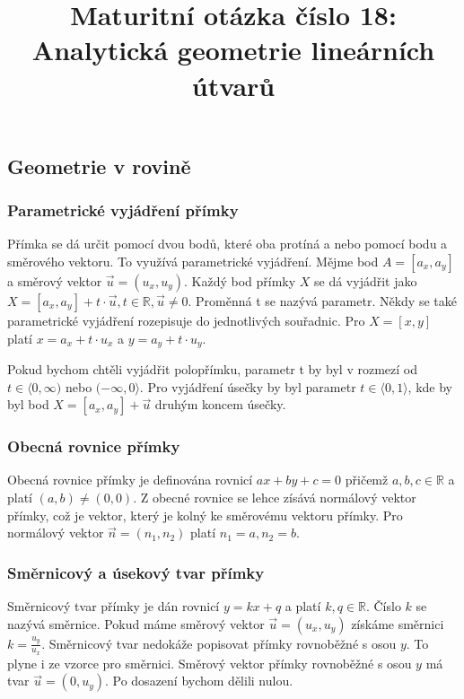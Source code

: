 \documentclass[12pt]{article}
\title{Maturitní otázka číslo 18: Analytická geometrie lineárních útvarů}
\author{}
\date{}
\begin{document}
\maketitle

\subsection*{Geometrie v rovině}
\subsubsection*{Parametrické vyjádření přímky}
Přímka se dá určit pomocí dvou bodů, které oba protíná a nebo pomocí bodu a směrového vektoru. To
využívá parametrické vyjádření. Mějme bod $A = [a_x, a_y]$ a směrový vektor $\vec{u} = (u_x, u_y)$.
Každý bod přímky $X$ se dá vyjádřit jako $X = [a_x, a_y] + t \cdot \vec{u}, t \in \mathbb{R}, \vec{u}
\ne 0$. Proměnná t se nazývá parametr. Někdy se také parametrické vyjádření rozepisuje do jednotlivých
souřadnic. Pro $X = [x, y]$ platí $x = a_x + t \cdot u_x$ a $y = a_y + t \cdot u_y$.

Pokud bychom chtěli vyjádřit polopřímku, parametr t by byl v rozmezí od $t \in \langle 0,
\infty)$ nebo $(- \infty, 0 \rangle$. Pro vyjádření úsečky by byl parametr $t \in \langle
0, 1 \rangle$, kde by byl bod $X = [a_x, a_y] + \vec{u}$ druhým koncem úsečky.

\subsubsection*{Obecná rovnice přímky}
Obecná rovnice přímky je definována rovnicí $ax + by + c = 0$ přičemž $a, b, c \in \mathbb{R}$ a
platí $(a, b) \ne (0, 0)$. Z obecné rovnice se lehce zísává normálový vektor přímky,
což je vektor, který je kolný ke směrovému vektoru přímky. Pro normálový vektor $\vec{n} =
(n_1, n_2)$ platí $n_1 = a, n_2 = b$.

\subsubsection*{Směrnicový a úsekový tvar přímky}
Směrnicový tvar přímky je dán rovnicí $y = kx + q$ a platí $k, q \in \mathbb{R}$. Číslo $k$ se nazývá směrnice. Pokud máme směrový
vektor $\vec{u} = (u_x, u_y)$ získáme směrnici $k = \frac{u_y}{u_x}$. Směrnicový tvar nedokáže
popisovat přímky rovnoběžné s osou $y$. To plyne i ze vzorce pro směrnici. Směrový vektor přímky
rovnoběžné s osou $y$ má tvar $\vec{u} = (0, u_y)$. Po dosazení bychom dělili nulou.
\end{document}

